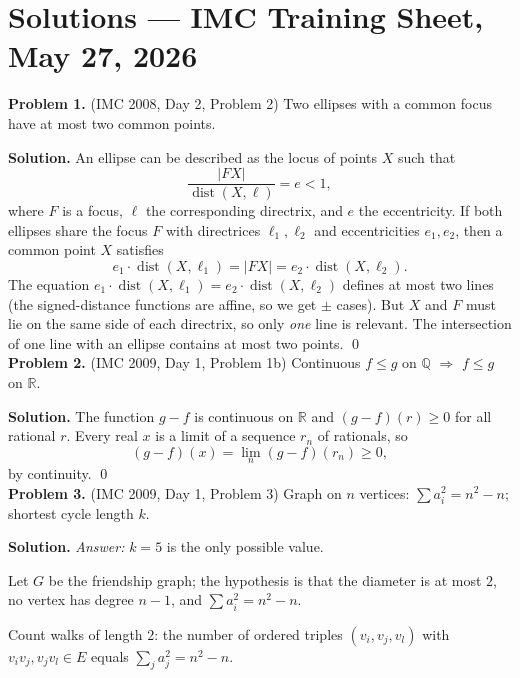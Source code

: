 \documentclass{article}
\newcommand{\R}{\mathbb{R}}
\newcommand{\Q}{\mathbb{Q}}
\begin{document}
\pagestyle{plain}

\section*{Solutions --- IMC Training Sheet, May 27, 2026}

\textbf{Problem 1.} (IMC 2008, Day 2, Problem 2)
Two ellipses with a common focus have at most two common points.

\textbf{Solution.}
An ellipse can be described as the locus of points \( X \) such that
\[
\frac{|FX|}{\operatorname{dist}(X, \ell)} = e < 1,
\]
where \( F \) is a focus, \( \ell \) the corresponding directrix, and \( e \) the eccentricity. If both ellipses share the focus \( F \) with directrices \( \ell_1, \ell_2 \) and eccentricities \( e_1, e_2 \), then a common point \( X \) satisfies
\[
e_1 \cdot \operatorname{dist}(X, \ell_1) = |FX| = e_2 \cdot \operatorname{dist}(X, \ell_2).
\]
The equation \( e_1 \cdot \operatorname{dist}(X, \ell_1) = e_2 \cdot \operatorname{dist}(X, \ell_2) \) defines at most two lines (the signed-distance functions are affine, so we get \( \pm \) cases). But \( X \) and \( F \) must lie on the same side of each directrix, so only \emph{one} line is relevant. The intersection of one line with an ellipse contains at most two points. \qed
\\

\textbf{Problem 2.} (IMC 2009, Day 1, Problem 1b)
Continuous \( f \leq g \) on \( \Q \) \( \Rightarrow \) \( f \leq g \) on \( \R \).

\textbf{Solution.}
The function \( g - f \) is continuous on \( \R \) and \( (g - f)(r) \geq 0 \) for all rational \( r \). Every real \( x \) is a limit of a sequence \( r_n \) of rationals, so
\[
(g - f)(x) = \lim_n (g - f)(r_n) \geq 0,
\]
by continuity. \qed
\\

\textbf{Problem 3.} (IMC 2009, Day 1, Problem 3)
Graph on \( n \) vertices: \( \sum a_i^2 = n^2 - n \); shortest cycle length \( k \).

\textbf{Solution.} \textit{Answer:} \( k = 5 \) is the only possible value.

Let \( G \) be the friendship graph; the hypothesis is that the diameter is at most \( 2 \), no vertex has degree \( n - 1 \), and \( \sum a_i^2 = n^2 - n \).

Count walks of length \( 2 \): the number of ordered triples \( (v_i, v_j, v_l) \) with \( v_i v_j, v_j v_l \in E \) equals \( \sum_j a_j^2 = n^2 - n \).
\end{document}
